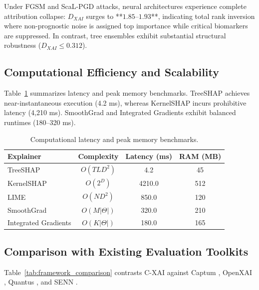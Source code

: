 \documentclass[3p,times,procedia]{elsarticle}
\theoremstyle{definition}
\begin{document}
Under FGSM and ScaL-PGD attacks, neural architectures experience complete attribution collapse: $D_{XAI}$ surges to **$1.85\text{--}1.93$**, indicating total rank inversion where non-prognostic noise is assigned top importance while critical biomarkers are suppressed. In contrast, tree ensembles exhibit substantial structural robustness ($D_{XAI} \le 0.312$).

\subsection{Computational Efficiency and Scalability}

Table~\ref{tab:latency} summarizes latency and peak memory benchmarks. TreeSHAP achieves near-instantaneous execution (4.2 ms), whereas KernelSHAP incurs prohibitive latency (4,210 ms). SmoothGrad and Integrated Gradients exhibit balanced runtimes (180--320 ms).

\begin{table}[h]
\centering
\small
\caption{Computational latency and peak memory benchmarks.}
\label{tab:latency}
\begin{tabular}{lccc}
\toprule
\textbf{Explainer} & \textbf{Complexity} & \textbf{Latency (ms)} & \textbf{RAM (MB)} \\
\midrule
TreeSHAP & $O(TLD^2)$ & 4.2 & 45 \\
KernelSHAP & $O(2^D)$ & 4210.0 & 512 \\
LIME & $O(ND^2)$ & 850.0 & 120 \\
SmoothGrad & $O(M|\Theta|)$ & 320.0 & 210 \\
Integrated Gradients & $O(K|\Theta|)$ & 180.0 & 165 \\
\bottomrule
\end{tabular}
\end{table}

\subsection{Comparison with Existing Evaluation Toolkits}

Table~\ref{tab:framework_comparison} contrasts C-XAI against Captum \cite{kokhlikyan2020captum}, OpenXAI \cite{agarwal2022openxai}, Quantus \cite{hedstrom2023quantus}, and SENN \cite{alvarezmelis2018towards}.
\end{document}
